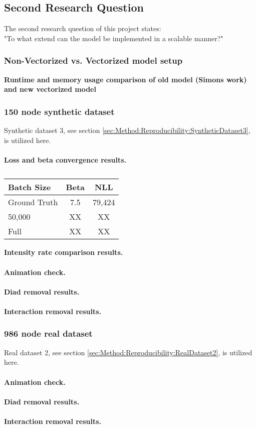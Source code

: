 \subsection{Second Research Question}
\label{sec:ResearchQuestion2}
The second research question of this project states:
\\
"To what extend can the model be implemented in a scalable manner?"



\subsubsection{Non-Vectorized vs. Vectorized model setup}
\label{sec:ResearchQuestion2:comparison}
\textbf{Runtime and memory usage comparison of old model (Simons work) and new vectorized model}



\subsubsection{150 node synthetic dataset}
\label{sec:ResearchQuestion2:150nodeSynthetic}

Synthetic dataset 3, see section \ref{sec:Method:Reproducibility:SyntheticDataset3}, is utilized here.
\\\\
\textbf{Loss and beta convergence results.}

\begin{table}[h!]
\centering
\begin{tabular}{|l|cc|}
\hline
Batch Size   & Beta & NLL\\ \hline
Ground Truth & 7.5  & 79,424      \\
50,000          & XX   & XX       \\
Full          & XX   & XX       \\
\hline
\end{tabular}
\caption{}
\label{tab:SingleStep1}
\end{table}
\noindent \textbf{Intensity rate comparison results.}
\\\\
\textbf{Animation check.}
\\\\
\textbf{Diad removal results.}
\\\\
\textbf{Interaction removal results.}
   

\subsubsection{986 node real dataset}
\label{sec:ResearchQuestion2:986nodeReal}

Real dataset 2, see section \ref{sec:Method:Reproducibility:RealDataset2}, is utilized here.
\\\\
\textbf{Animation check.}
\\\\
\textbf{Diad removal results.}
\\\\
\textbf{Interaction removal results.}

